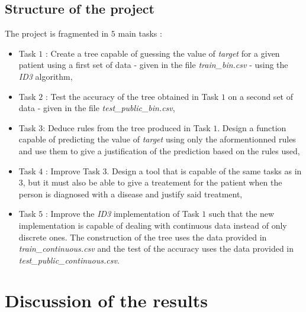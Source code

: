 \documentclass[french]{article}
\begin{document}
\subsection{Structure of the project}
The project is fragmented in $5$ main tasks :
	\begin{itemize} 
		\item Task $1$ : Create a tree capable of guessing the value of \emph{target} for a given patient using a first set of data - given in the file \emph{train\_bin.csv} - using the \emph{ID3} algorithm,
		\item Task $2$ : Test the accuracy of the tree obtained in Task $1$ on a second set of data - given in the file \emph{test\_public\_bin.csv},
		\item Task $3 $: Deduce rules from the tree produced in Task $1$. Design a function capable of predicting the value of \emph{target} using only the aformentionned rules and use them to give a justification of the prediction based on the rules used,
		\item Task $4$ : Improve Task $3$. Design a tool that is capable of the same tasks as in $3$, but it must also be able to give a treatement for the patient when the person is diagnosed with a disease and justify said treatment,
		\item Task $5$ : Improve the \emph{ID3} implementation of Task $1$ such that the new implementation is capable of dealing with continuous data instead of only discrete ones. The construction of the tree uses the data provided in \emph{train\_continuous.csv} and the test of the accuracy uses the data provided in \emph{test\_public\_continuous.csv}.
	\end{itemize}

\section{Discussion of the results}
\end{document}
